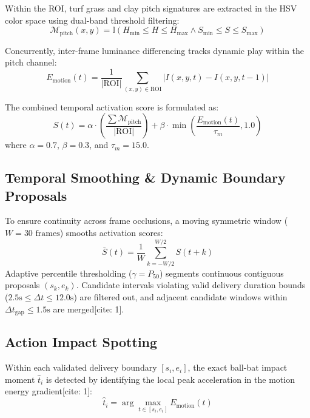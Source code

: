 ﻿\documentclass[10pt,journal,compsoc]{IEEEtran}
\begin{document}
Within the ROI, turf grass and clay pitch signatures are extracted in the HSV color space using dual-band threshold filtering:
\begin{equation}
\mathcal{M}_{\text{pitch}}(x, y) = \mathbb{I}\left( H_{\text{min}} \le H \le H_{\text{max}} \land S_{\text{min}} \le S \le S_{\text{max}} \right)
\end{equation}

Concurrently, inter-frame luminance differencing tracks dynamic play within the pitch channel:
\begin{equation}
E_{\text{motion}}(t) = \frac{1}{|\text{ROI}|} \sum_{(x,y) \in \text{ROI}} |I(x, y, t) - I(x, y, t-1)|
\end{equation}

The combined temporal activation score is formulated as:
\begin{equation}
S(t) = \alpha \cdot \left( \frac{\sum \mathcal{M}_{\text{pitch}}}{|\text{ROI}|} \right) + \beta \cdot \min\left(\frac{E_{\text{motion}}(t)}{\tau_m}, 1.0\right)
\end{equation}
where $\alpha = 0.7$, $\beta = 0.3$, and $\tau_m = 15.0$.

\subsection{Temporal Smoothing \& Dynamic Boundary Proposals}
To ensure continuity across frame occlusions, a moving symmetric window ($W = 30\text{ frames}$) smooths activation scores:
\begin{equation}
\bar{S}(t) = \frac{1}{W} \sum_{k = -W/2}^{W/2} S(t + k)
\end{equation}
Adaptive percentile thresholding ($\gamma = P_{50}$) segments continuous contiguous proposals $(s_k, e_k)$. Candidate intervals violating valid delivery duration bounds ($2.5\text{s} \le \Delta t \le 12.0\text{s}$) are filtered out, and adjacent candidate windows within $\Delta t_{\text{gap}} \le 1.5\text{s}$ are merged[cite: 1].

\subsection{Action Impact Spotting}
Within each validated delivery boundary $[s_i, e_i]$, the exact ball-bat impact moment $\hat{t}_i$ is detected by identifying the local peak acceleration in the motion energy gradient[cite: 1]:
\begin{equation}
\hat{t}_i = \arg\max_{t \in [s_i, e_i]} E_{\text{motion}}(t)
\end{equation}
\end{document}
